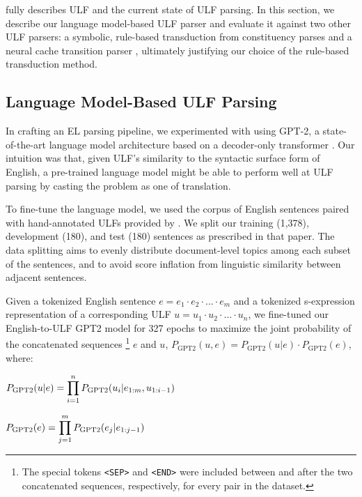 \citet{kim2022corpus} fully describes ULF and the current state of ULF parsing. In this section, we describe our language model-based ULF parser \citep{gibson2022language} and evaluate it against two other ULF parsers: a symbolic, rule-based transduction from constituency parses \citep{kim2021naloma} and a neural cache transition parser \citep{kim2021transition}, ultimately justifying our choice of the rule-based transduction method.


\iffalse
\subsection{Language Model-Based ULF Parsing}
In crafting an EL parsing pipeline, we experimented with using GPT-2, a state-of-the-art language model architecture based on a decoder-only transformer \citep{Radford2019LanguageMA}. Our intuition was that, given ULF's similarity to the syntactic surface form of English, a pre-trained language model might be able to perform well at ULF parsing by casting the problem as one of translation.

To fine-tune the language model, we used the corpus of English sentences paired with hand-annotated ULFs provided by \citet{kim2021transition}. We split our training (1,378), development (180), and test (180) sentences as prescribed in that paper. The data splitting aims to evenly distribute document-level topics among each subset of the sentences, and to avoid score inflation from linguistic similarity between adjacent sentences.

Given a tokenized English sentence $e = e_{1} \cdot e_{2} \cdot \ldots \cdot e_{m}$ and a tokenized s-expression representation of a corresponding ULF $u = u_{1} \cdot u_{2} \cdot \ldots \cdot u_{n}$, we fine-tuned our English-to-ULF GPT2 model for 327 epochs to maximize the joint probability of the concatenated sequences \footnote{The special tokens \texttt{<SEP>} and \texttt{<END>} were included between and after the two concatenated sequences, respectively, for every pair in the dataset.} $e$ and $u$, $P_{\textrm{GPT2}}(u,e) = P_{\textrm{GPT2}}(u|e) \cdot P_{\textrm{GPT2}}(e)$, where:

\vspace{3mm}

$\mathlarger{P_{\textrm{GPT2}}(u|e) = \prod_{i=1}^{n} P_{\textrm{GPT2}}(u_{i} | e_{1:m},u_{1:i-1})}$
\vspace{1mm}

$\mathlarger{P_{\textrm{GPT2}}(e) = \prod_{j=1}^{m} P_{\textrm{GPT2}}(e_{j} | e_{1:j-1})}$

